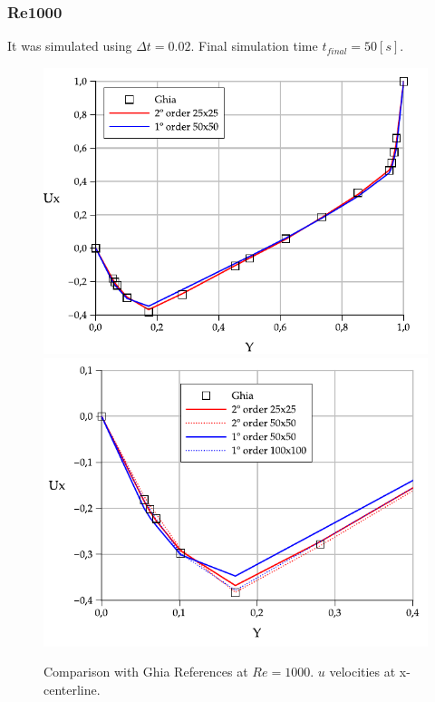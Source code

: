 \documentclass[a4paper,conference]{IEEEtran}
\begin{document}
\subsubsection{Re1000}

It was simulated using $\Delta t = 0.02$. Final simulation time $t_{final} = 50[s]$. 

\begin{figure}[htbp]
  \begin{center}
      \includegraphics[width=.85\linewidth]{images/Re_1000_Ux.pdf}
      \includegraphics[width=.85\linewidth]{images/Re_1000_Ux_zoom.pdf}
  \end{center}
  \caption{\label{fg:Re1000u} Comparison with Ghia References at $Re=1000$. $u$ velocities at x-centerline.}
\end{figure}
\end{document}
